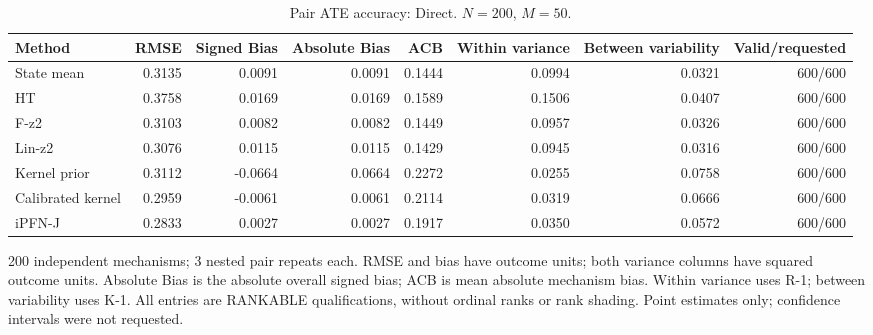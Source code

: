 \begin{table}[tb]
\centering
\scriptsize
\caption{Pair ATE accuracy: Direct. $N=200$, $M=50$.}
\begin{tabular}{lrrrrrrr}
\toprule
Method & RMSE & Signed Bias & Absolute Bias & ACB & Within variance & Between variability & Valid/requested \\
\midrule
State mean & 0.3135 & 0.0091 & 0.0091 & 0.1444 & 0.0994 & 0.0321 & 600/600 \\
HT & 0.3758 & 0.0169 & 0.0169 & 0.1589 & 0.1506 & 0.0407 & 600/600 \\
F-z2 & 0.3103 & 0.0082 & 0.0082 & 0.1449 & 0.0957 & 0.0326 & 600/600 \\
Lin-z2 & 0.3076 & 0.0115 & 0.0115 & 0.1429 & 0.0945 & 0.0316 & 600/600 \\
Kernel prior & 0.3112 & -0.0664 & 0.0664 & 0.2272 & 0.0255 & 0.0758 & 600/600 \\
Calibrated kernel & 0.2959 & -0.0061 & 0.0061 & 0.2114 & 0.0319 & 0.0666 & 600/600 \\
iPFN-J & 0.2833 & 0.0027 & 0.0027 & 0.1917 & 0.0350 & 0.0572 & 600/600 \\
\bottomrule
\end{tabular}
\par\smallskip\begin{minipage}{\linewidth}\scriptsize
200 independent mechanisms; 3 nested pair repeats each. RMSE and bias have outcome units; both variance columns have squared outcome units. Absolute Bias is the absolute overall signed bias; ACB is mean absolute mechanism bias. Within variance uses R-1; between variability uses K-1. All entries are RANKABLE qualifications, without ordinal ranks or rank shading. Point estimates only; confidence intervals were not requested.
\end{minipage}\end{table}
